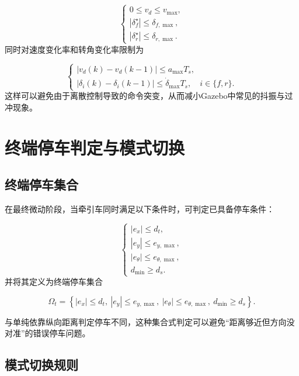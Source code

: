 \begin{equation}
\begin{cases}
0\leq v_d\leq v_{\max},\\
|\delta_f^{\star}|\leq\delta_{f,\max},\\
|\delta_r^{\star}|\leq\delta_{r,\max}.
\end{cases}
\label{eq:command_limits}
\end{equation}
同时对速度变化率和转角变化率限制为

\begin{equation}
\begin{cases}
|v_d(k)-v_d(k-1)|\leq a_{\max}T_s,\\
|\delta_i(k)-\delta_i(k-1)|\leq\dot{\delta}_{\max}T_s,\quad i\in\{f,r\}.
\end{cases}
\label{eq:rate_limits}
\end{equation}
这样可以避免由于离散控制导致的命令突变，从而减小Gazebo中常见的抖振与过冲现象。

\section{终端停车判定与模式切换}

\subsection{终端停车集合}

在最终微动阶段，当牵引车同时满足以下条件时，可判定已具备停车条件：

\begin{equation}
\begin{cases}
|e_x|\leq d_t,\\
|e_y|\leq e_{y,\max},\\
|e_\theta|\leq e_{\theta,\max},\\
d_{\min}\geq d_s.
\end{cases}
\label{eq:terminal_conditions}
\end{equation}
并将其定义为终端停车集合

\begin{equation}
\Omega_t=\left\{ |e_x|\leq d_t,\ |e_y|\leq e_{y,\max},\ |e_\theta|\leq e_{\theta,\max},\ d_{\min}\geq d_s \right\}.
\label{eq:terminal_set}
\end{equation}

与单纯依靠纵向距离判定停车不同，这种集合式判定可以避免``距离够近但方向没对准''的错误停车问题。

\subsection{模式切换规则}

